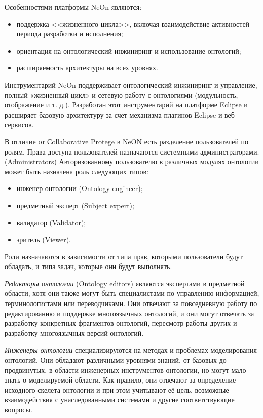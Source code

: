 Особенностями платформы NeOn являются:
\begin{itemize}
    \item поддержка <<жизненного цикла>>, включая взаимодействие активностей периода разработки и исполнения;
    \item ориентация на онтологический инжиниринг и использование онтологий;
    \item расширяемость архитектуры на всех уровнях.
\end{itemize}

Инструментарий NeOn поддерживает онтологический инжиниринг и управление, полный «жизненный цикл» и сетевую работу с онтологиями (модульность, отображение и т. д.). Разработан этот инструментарий на платформе Eclipse и расширяет базовую архитектуру за счет механизма плагинов Eclipse и веб-сервисов.

В отличие от Сollaborative Protege в NeON есть разделение пользователей по ролям. Права доступа пользователей назначаются системными администраторами. (Administrators) Авторизованному пользователю в различных модулях онтологии может быть назначена роль следующих типов:
\begin{itemize}
    \item инженер онтологии (Ontology engineer);
    \item предметный эксперт (Subject expert);
    \item валидатор (Validator);
    \item зритель (Viewer).
\end{itemize}

Роли назначаются в зависимости от типа прав, которыми пользователи будут обладать, и типа задач, которые они будут выполнять.

\textit{Редакторы онтологии} (Ontology editors) являются экспертами в предметной области, хотя они также могут быть специалистами по управлению информацией, терминологистами или переводчиками. Они отвечают за повседневную работу по редактированию и поддержке многоязычных онтологий, и они могут отвечать за разработку конкретных фрагментов онтологий, пересмотр работы других и разработку многоязычных версий онтологий.

\textit{Инженеры онтологии} специализируются на методах и проблемах моделирования онтологий. Они обладают различными уровнями знаний, от базовых до продвинутых, в области инженерных инструментов онтологии, но могут мало знать о моделируемой области. Как правило, они отвечают за определение исходного скелета онтологии и при этом учитывают её цель, возможные взаимодействия с унаследованными системами и другие соответствующие вопросы.

